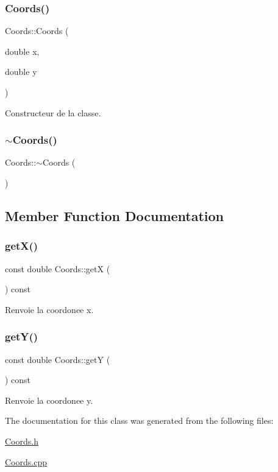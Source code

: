 \subsubsection{\texorpdfstring{Coords()}{Coords()}}
{\footnotesize\ttfamily Coords\+::\+Coords (\begin{DoxyParamCaption}\item[{double}]{x,  }\item[{double}]{y }\end{DoxyParamCaption})}



Constructeur de la classe. 

\mbox{\label{class_coords_a475cfe7279f33a807a682d6fccb529dc}} 
\subsubsection{\texorpdfstring{$\sim$Coords()}{~Coords()}}
{\footnotesize\ttfamily Coords\+::$\sim$\+Coords (\begin{DoxyParamCaption}{ }\end{DoxyParamCaption})}



\subsection{Member Function Documentation}
\mbox{\label{class_coords_ace1df844690c765993d4aab4444dc3bb}} 
\subsubsection{\texorpdfstring{getX()}{getX()}}
{\footnotesize\ttfamily const double Coords\+::getX (\begin{DoxyParamCaption}{ }\end{DoxyParamCaption}) const}



Renvoie la coordonee x. 

\mbox{\label{class_coords_a97ee10f1880dca8a6139ab69e822d26f}} 
\subsubsection{\texorpdfstring{getY()}{getY()}}
{\footnotesize\ttfamily const double Coords\+::getY (\begin{DoxyParamCaption}{ }\end{DoxyParamCaption}) const}



Renvoie la coordonee y. 



The documentation for this class was generated from the following files\+:\begin{DoxyCompactItemize}
\item 
\mbox{\hyperlink{_coords_8h}{Coords.\+h}}\item 
\mbox{\hyperlink{_coords_8cpp}{Coords.\+cpp}}\end{DoxyCompactItemize}
